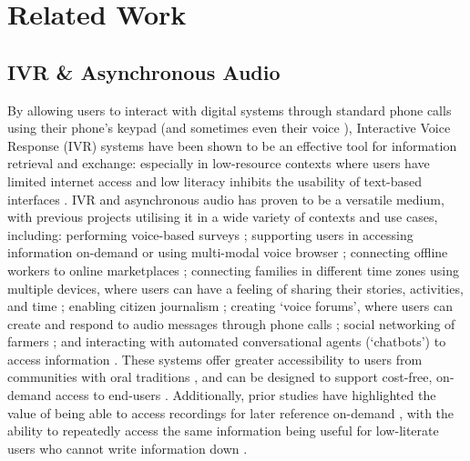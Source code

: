 \section{Related Work}

\subsection{IVR \& Asynchronous Audio}

By allowing users to interact with digital systems through standard phone calls using their phone's keypad (and sometimes even their voice \cite{khullar2021}), Interactive Voice Response (IVR) systems have been shown to be an effective tool for information retrieval and exchange: especially in low-resource contexts where users have limited internet access \cite{eitzinger2019} and low literacy inhibits the usability of text-based interfaces \cite{sharma2009}. IVR and asynchronous audio has proven to be a versatile medium, with previous projects utilising it in a wide variety of contexts and use cases, including: performing voice-based surveys \cite{khullar2021_surveys}; supporting users in accessing information on-demand \cite{Riaz2017} or using multi-modal voice browser \cite{mahelaqua2013}; connecting offline workers to online marketplaces \cite{Richardson2022}; connecting families in different time zones using multiple devices, where users can have a feeling of sharing their stories, activities, and time \cite{heshmat2020}; enabling citizen journalism \cite{Ejaz2018}; creating `voice forums', where users can create and respond to audio messages through phone calls \cite{Patel2010, Vashistha2015}; social networking of farmers \cite{Indrani2015}; and interacting with automated conversational agents (`chatbots') to access information \cite{Jain2018, Yadav2019}. These systems offer greater accessibility to users from communities with oral traditions \cite{Ndwe2012}, and can be designed to support cost-free, on-demand access to end-users \cite{Richardson2022, zhang1998}. Additionally, prior studies have highlighted the value of being able to access recordings for later reference on-demand \cite{Talhouk2017}, with the ability to repeatedly access the same information being useful for low-literate users who cannot write information down \cite{Jain2018}. 

